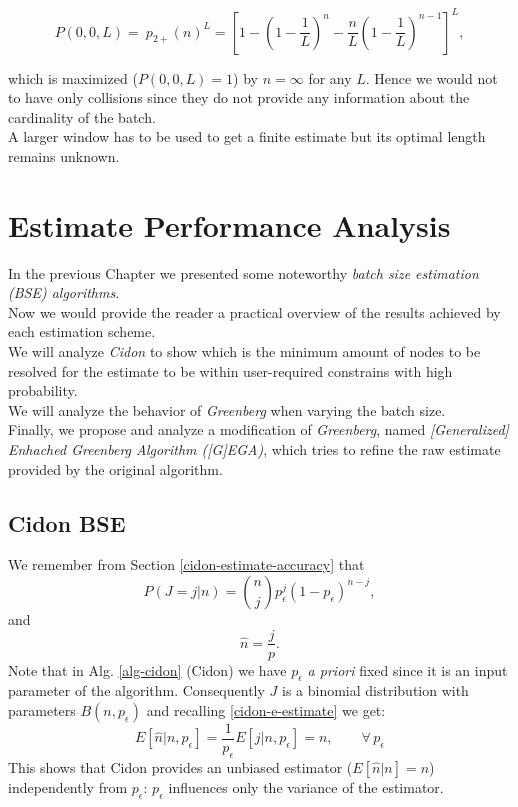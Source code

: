 \documentclass[11pt,a4paper,twoside,openright]{book}
\newcommand{\pc}{p_{\epsilon}}
\begin{document}
\begin{equation}
P(0,0,L)=\ p_{2+}(n)^{L} = \left[1-\left(1-\frac{1}{L}\right)^{n}-\frac{n}{L}\left(1-\frac{1}{L}\right)^{n-1}\right]^{L},
\end{equation}

\noindent which is maximized ($P(0,0,L)=1$) by $n=\infty$ for any $L$. Hence we would not to have only collisions since they do not provide any information about the cardinality of the batch.\\ A larger  window has to be used to get a finite estimate but its optimal length remains unknown.

\chapter{Estimate Performance Analysis}
\label{ch:Performance Analysis}

In the previous Chapter we presented some noteworthy  \emph{batch size estimation  (BSE) algorithms}.\\ Now we would provide the reader a practical overview of the results achieved by each estimation scheme.\\
We will analyze \emph{Cidon} to show which is the minimum amount of nodes to be resolved for the estimate to be within user-required constrains with high probability.\\  
We will analyze the behavior of \emph{Greenberg} when varying the batch size.\\
Finally, we propose and analyze a modification of \emph{Greenberg}, named \emph{[Generalized] Enhached Greenberg Algorithm ([G]EGA)}, which tries to refine the raw estimate provided by the original algorithm.
\section{Cidon BSE}

\begin{equation*}
\end{equation*}
We remember from Section \ref{cidon-estimate-accuracy} that
\begin{equation*}P(J=j|n)={n \choose j}\pc^{j}(1-\pc)^{n-j},\end{equation*}
and
\begin{equation*}\hat{n}=\frac{j}{p}.\end{equation*}
Note that  in Alg. \ref{alg-cidon} (Cidon) we have $\pc$ \emph{a priori} fixed since it is an input parameter of the algorithm. Consequently $J$ is a binomial distribution with parameters $B(n,\pc)$ and recalling \eqref{cidon-e-estimate}
we get:
\begin{equation}
E[\hat{n}|n,\pc]=\frac{1}{\pc}E\left[j|n,\pc\right]=n, \qquad \forall \,\pc
\end{equation}
This shows that Cidon provides an unbiased estimator ($E[\hat{n}|n]=n$) independently from $\pc$: $\pc$ influences only the variance of the estimator. 
\end{document}
